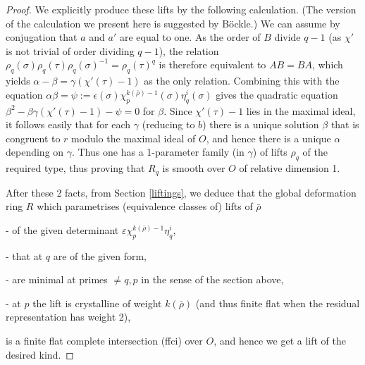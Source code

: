 \documentclass[12pt]{amsart}
\newcommand{\rhobar}{\overline{\rho}}
\def\rhobar{ {\bar {\rho} } }
\def\rhob{ {\bar {\rho} } }
\newcommand{\vep}{{\varepsilon}}
\begin{document}
\begin{proof}
We explicitly produce these lifts by the following calculation. (The version 
of the calculation we present here is suggested by B\"ockle.)
We can assume by conjugation that $a$ and $a'$ are equal to one. 
As the order of $B$ divide $q-1$ (as $\chi'$ is not trivial of order dividing $q-1$), the relation 
$\rho_q(\sigma)\rho_q(\tau)\rho_q(\sigma)^{-1}=\rho_q(\tau)^q$
is therefore equivalent to $AB=BA$, which yields
     $\alpha-\beta=\gamma(\chi'(\tau)-1)$
  as the only relation. Combining this with the equation 
$\alpha\beta=\psi:=\epsilon(\sigma)
\chi_p^{k(\rhobar)-1}(\sigma)\eta_q^i(\sigma)$
  gives the quadratic equation
     $\beta^2-\beta\gamma(\chi'(\tau)-1)-\psi=0$ for $\beta$.
  Since $\chi'(\tau)-1$ lies in the maximal ideal, it follows easily that 
  for each $\gamma$ (reducing to $b$)
  there is a unique solution $\beta$ that is congruent to $r$ 
  modulo the maximal ideal of $ O$, and hence there is a unique $\alpha$ depending on $\gamma$.
  Thus one has a 1-parameter family (in $\gamma$) of lifts 
$\rho_q$ of the required type, thus proving that $R_q$ is smooth over $O$ of relative dimension 1.

\vspace{3mm}

After these 2 facts, from Section \ref{liftings}, we deduce that
the global deformation ring $R$ which parametrises (equivalence classes of) lifts of $\rhob$

- of the given determinant $\vep\chi_p^{k(\rhobar)-1}\eta_q^i$, 

- that at $q$ are of the given form,

- are minimal at primes $\neq q,p$ in the sense of the section above, 

- at $p$ the lift is crystalline of weight $k(\rhobar)$ 
(and thus finite flat when the residual representation has weight 2),

\noindent is a finite flat complete intersection (ffci) over $O$, and hence we get a lift of the desired kind. 


\end{proof}
\end{document}
